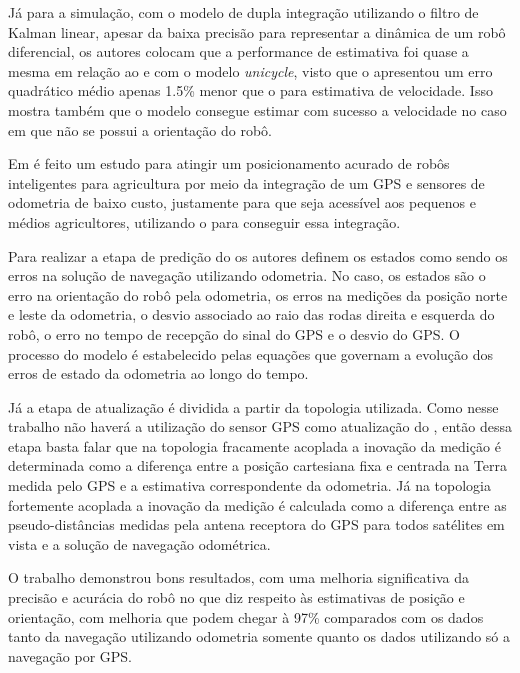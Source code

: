 \documentclass[acronym, symbols, table]{fei}
\begin{document}
	Já para a simulação, com o modelo de dupla integração utilizando o filtro de Kalman linear, apesar da baixa precisão para representar a dinâmica de um robô diferencial, os autores colocam que a performance de estimativa foi quase a mesma em relação ao  e  com o modelo \textit{unicycle}, visto que o  apresentou um erro quadrático médio apenas 1.5\% menor que o  para estimativa de velocidade. Isso mostra também que o modelo consegue estimar com sucesso a velocidade no caso em que não se possui a orientação do robô.
	
	Em \textcite{10333060} é feito um estudo para atingir um posicionamento acurado de robôs inteligentes para agricultura por meio da integração de um GPS e sensores de odometria de baixo custo, justamente para que seja acessível aos pequenos e médios agricultores, utilizando o  para conseguir essa integração.
	
	Para realizar a etapa de predição do  os autores definem os estados como sendo os erros na solução de navegação utilizando odometria. No caso, os estados são o erro na orientação do robô pela odometria, os erros na medições da posição norte e leste da odometria, o desvio associado ao raio das rodas direita e esquerda do robô, o erro no tempo de recepção do sinal do GPS e o desvio do GPS. O processo do modelo é estabelecido pelas equações que governam a evolução dos erros de estado da odometria ao longo do tempo.
	
	Já a etapa de atualização é dividida a partir da topologia utilizada. Como nesse trabalho não haverá a utilização do sensor GPS como atualização do , então dessa etapa basta falar que na topologia fracamente acoplada a inovação da medição é determinada como a diferença entre a posição cartesiana fixa e centrada na Terra medida pelo GPS e a estimativa correspondente da odometria. Já na topologia fortemente acoplada a inovação da medição é calculada como a diferença entre as pseudo-distâncias medidas pela antena receptora do GPS para todos satélites em vista e a solução de navegação odométrica.
	
	O trabalho demonstrou bons resultados, com uma melhoria significativa da precisão e acurácia do robô no que diz respeito às estimativas de posição e orientação, com melhoria que podem chegar à 97\% comparados com os dados tanto da navegação utilizando odometria somente quanto os dados utilizando só a navegação por GPS.
	
\end{document}
